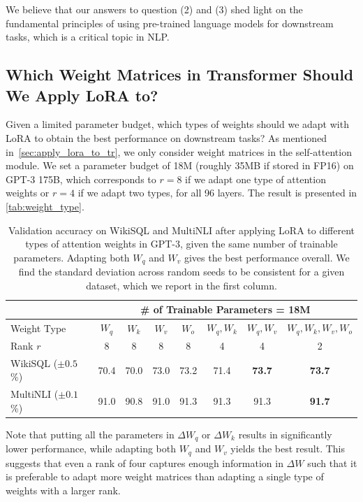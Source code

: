 \documentclass{article} %
\begin{document}
We believe that our answers to question (2) and (3) shed light on the fundamental principles of using pre-trained language models for downstream tasks, which is a critical topic in NLP. 



\subsection{Which Weight Matrices in Transformer Should We Apply LoRA to?}
\label{sec:weight_types}
Given a limited parameter budget, which types of weights should we adapt with LoRA to obtain the best performance on downstream tasks?
As mentioned in~\autoref{sec:apply_lora_to_tr}, we only consider weight matrices in the self-attention module.
We set a parameter budget of 18M (roughly 35MB if stored in FP16) on GPT-3 175B, which corresponds to $r=8$ if we adapt one type of attention weights or $r=4$ if we adapt two types, for all 96 layers.
The result is presented in \autoref{tab:weight_type}.

\begin{table}[h]
  \centering
  \begin{tabular}{l|ccccccc}
  \hline
  \toprule
                & \multicolumn{7}{c}{\# of Trainable Parameters = 18M} \\
  \midrule
  Weight Type           & $W_q$  & $W_k$  & $W_v$  & $W_o$      & $W_q,W_k$     & $W_q,W_v$     & $W_q, W_k, W_v, W_o$      \\
  Rank $r$              & 8      &  8     &  8     &   8        &   4           &   4           &   2                       \\
  \midrule
  WikiSQL ($\pm0.5$\%)  & 70.4   & 70.0   & 73.0   & 73.2       & 71.4          & \textbf{73.7} & \textbf{73.7}             \\
  MultiNLI ($\pm0.1$\%) & 91.0   & 90.8   & 91.0   & 91.3       & 91.3          & 91.3          & \textbf{91.7}              \\
  \bottomrule
  \end{tabular}
  \caption{Validation accuracy on WikiSQL and MultiNLI after applying LoRA to different types of attention weights in GPT-3, given the same number of trainable parameters. Adapting both $W_q$ and $W_v$ gives the best performance overall. We find the standard deviation across random seeds to be consistent for a given dataset, which we report in the first column.}
  \label{tab:weight_type}
\end{table}

Note that putting all the parameters in $\Delta W_q$ or $\Delta W_k$ results in significantly lower performance, while adapting both $W_q$ and $W_v$ yields the best result.
This suggests that even a rank of four captures enough information in $\Delta W$ such that it is preferable to adapt more weight matrices than adapting a single type of weights with a larger rank.
\end{document}
